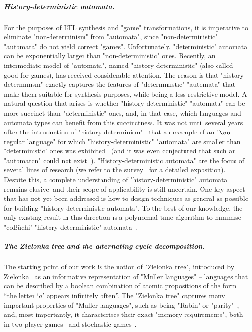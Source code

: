 \documentclass[10pt,a4paper]{amsart}
\begin{document}
\subparagraph{History-deterministic automata.} For the purposes of LTL synthesis and "game" transformations, it is imperative to eliminate "non-determinism" from "automata", since "non-deterministic" "automata" do not yield correct "games". Unfortunately, "deterministic" automata can be exponentially larger than "non-deterministic" ones.  
Recently, an intermediate model of "automata", named "history-deterministic" (also called good-for-games), has received considerable attention. The reason is that "history-determinism" exactly captures the features of "deterministic" "automata" that make them suitable for synthesis purposes, while being a less restrictive model.
A natural question that arises is whether "history-deterministic" "automata" can be more succinct than "deterministic" ones, and, in that case, which languages and automata types can benefit from this succinctness. It was not until several years after the introduction of "history-determinism"~\cite{HP06, Colcombet2009CostFunctions} that an example of an "$\oo$-regular language" for which "history-deterministic" "automata" are smaller than "deterministic" ones was exhibited~\cite{KS15DeterminisationGFG} (and it was even conjectured that such an "automaton" could not exist~\cite{Colcombet2012FormsND}).
"History-deterministic automata" are the focus of several lines of research (we refer to the survey~\cite{BL23SurveyHD} for a detailed exposition). Despite this, a complete understanding of "history-deterministic" automata remains elusive, and their scope of applicability is still uncertain. One key aspect that has not yet been addressed is how to design techniques as general as possible for building "history-deterministic automata". To the best of our knowledge, the only existing result in this direction is a polynomial-time algorithm to minimise "coBüchi" "history-deterministic" automata~\cite{AK22MinimizingGFG}.


\subparagraph{The Zielonka tree and the alternating cycle decomposition.} The starting point of our work is the notion of "Zielonka tree", introduced by Zielonka~\cite{Zielonka1998infinite} as an informative representation of "Muller languages" -- languages that can be described by a boolean
combination of atomic propositions of the form ``the letter `$a$' appears infinitely often''. The "Zielonka tree" captures many important properties of "Muller languages", such as being "Rabin" or "parity"~\cite{Zielonka1998infinite}, and, most importantly, it characterises their exact "memory requirements", both in two-player games~\cite{DJW1997memory} and stochastic games~\cite{Horn09RandomFruits}. 
\end{document}
